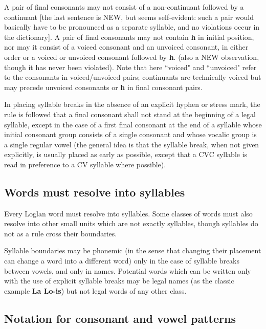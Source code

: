 \documentclass[12pt]{book}
\begin{document}
\begin{enumerate}
A pair of final consonants may not consist of a non-continuant followed by a continuant [the last sentence is NEW, but seems self-evident:  such a pair would basically have to be pronounced as a separate syllable, and no violations occur in the dictionary].  A pair of final consonants may not contain {\bf h} in initial position, nor may it consist of a voiced consonant and an unvoiced consonant, in either order or a voiced or unvoiced consonant followed by {\bf h}.  (also a NEW observation, though it has never been violated).  Note that here ``voiced" and ``unvoiced" refer to the consonants in voiced/unvoiced pairs;  continuants are technically voiced but may precede unvoiced consonants or {\bf h} in final consonant pairs.

In placing syllable breaks in the absence of an explicit hyphen or stress mark, the rule is followed that a final consonant shall not stand at the beginning of a legal syllable, except in the case of a first final consonant at the end of a syllable whose initial consonant group consists of a single consonant and whose vocalic group is a single regular vowel (the general idea is that the syllable break, when not given explicitly, is usually placed as early as possible, except that a CVC syllable is read in preference to a CV syllable where possible).   

\end{enumerate}

\subsection{Words must resolve into syllables}

Every Loglan word must resolve into syllables.  Some classes of words must also resolve into other small units which are not exactly syllables, though syllables do not as a rule cross their boundaries.

Syllable boundaries may be phonemic (in the sense that changing their placement can change a word into a different word) only in the case of syllable breaks between vowels, and only in names.   Potential words which can be written only with the use of explicit syllable breaks may be legal names (as the classic example {\bf La Lo-is}) but not legal words of any other class.

\subsection{Notation for consonant and vowel patterns}
\end{document}
